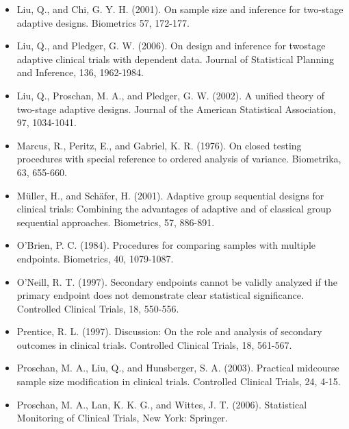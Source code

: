 \documentclass[10pt]{article}
\begin{document}
\begin{itemize}
  \item[31.] Liu, Q., and Chi, G. Y. H. (2001). On sample size and inference for two-stage adaptive designs. Biometrics 57, 172-177.
  \item[32.] Liu, Q., and Pledger, G. W. (2006). On design and inference for twostage adaptive clinical trials with dependent data. Journal of Statistical Planning and Inference, 136, 1962-1984.
  \item[33.] Liu, Q., Proschan, M. A., and Pledger, G. W. (2002). A unified theory of two-stage adaptive designs. Journal of the American Statistical Association, 97, 1034-1041.
  \item[34.] Marcus, R., Peritz, E., and Gabriel, K. R. (1976). On closed testing procedures with special reference to ordered analysis of variance. Biometrika, 63, 655-660.
  \item[35.] Müller, H., and Schäfer, H. (2001). Adaptive group sequential designs for clinical trials: Combining the advantages of adaptive and of classical group sequential approaches. Biometrics, 57, 886-891.
  \item[36.] O'Brien, P. C. (1984). Procedures for comparing samples with multiple endpoints. Biometrics, 40, 1079-1087.
  \item[37.] O'Neill, R. T. (1997). Secondary endpoints cannot be validly analyzed if the primary endpoint does not demonstrate clear statistical significance. Controlled Clinical Trials, 18, 550-556.
  \item[38.] Prentice, R. L. (1997). Discussion: On the role and analysis of secondary outcomes in clinical trials. Controlled Clinical Trials, 18, 561-567.
  \item[39.] Proschan, M. A., Liu, Q., and Hunsberger, S. A. (2003). Practical midcourse sample size modification in clinical trials. Controlled Clinical Trials, 24, 4-15.
  \item[40.] Proschan, M. A., Lan, K. K. G., and Wittes, J. T. (2006). Statistical Monitoring of Clinical Trials, New York: Springer.
\end{itemize}
\end{document}
